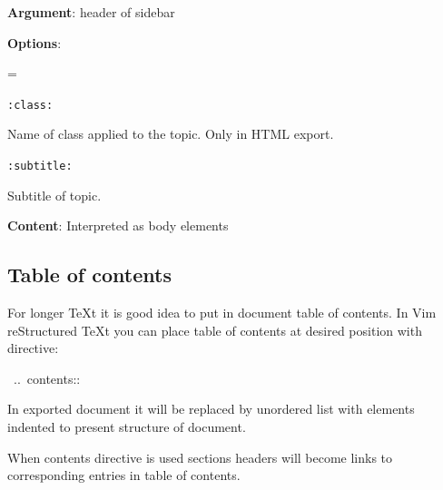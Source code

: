 \documentclass[12pt]{article}
\newenvironment{deflist}[1]{%
\begin{list}{}
{\renewcommand{\makelabel}[1]{\textbf{##1}\hfill}
\settowidth{\labelwidth}{\textbf{#1}}
\leftmargin=\labelwidth
\advance \leftmargin\labelsep}}
{\end{list}}
\begin{document}
\begin{itemize}
\item
\textbf{Argument}: header of sidebar

\item
\textbf{Options}:

 \begin{deflist}{iii}

\item[ \texttt{:class:}]

Name of class applied to the topic. Only in HTML export.

\item[ \texttt{:subtitle:}]

Subtitle of topic.
\end{deflist}

\item
\textbf{Content}: Interpreted as body elements
\end{itemize}
\hypertarget{ltable-of-contents}{}
\subsection{Table of contents}

For longer \TeX{}t it is good idea to put in document table of contents.
In Vim reStructured \TeX{}t you can place table of contents at desired position with
directive:

\begin{ttfamily}\begin{flushleft}
\mbox{~..~contents::}\\
\end{flushleft}\end{ttfamily}

In exported document it will be replaced by unordered list with elements
indented to present structure of document.

When contents directive is used sections headers will become links to
corresponding entries in table of contents.
\end{document}
